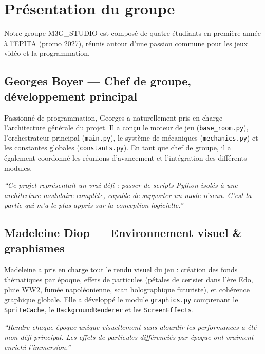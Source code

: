 \documentclass[12pt, a4paper]{report}
\begin{document}
\section{Pr\'{e}sentation du groupe}

Notre groupe M3G\_STUDIO est compos\'{e} de quatre \'{e}tudiants en premi\`{e}re ann\'{e}e \`{a} l'EPITA (promo 2027), r\'{e}unis autour d'une passion commune pour les jeux vid\'{e}o et la programmation.

\subsection{Georges Boyer --- Chef de groupe, d\'{e}veloppement principal}

Passionn\'{e} de programmation, Georges a naturellement pris en charge l'architecture g\'{e}n\'{e}rale du projet. Il a con\c{c}u le moteur de jeu (\texttt{base\_room.py}), l'orchestrateur principal (\texttt{main.py}), le syst\`{e}me de m\'{e}caniques (\texttt{mechanics.py}) et les constantes globales (\texttt{constants.py}). En tant que chef de groupe, il a \'{e}galement coordonn\'{e} les r\'{e}unions d'avancement et l'int\'{e}gration des diff\'{e}rents modules.

\textit{``Ce projet repr\'{e}sentait un vrai d\'{e}fi : passer de scripts Python isol\'{e}s \`{a} une architecture modulaire compl\`{e}te, capable de supporter un mode r\'{e}seau. C'est la partie qui m'a le plus appris sur la conception logicielle.''}

\subsection{Madeleine Diop --- Environnement visuel \& graphismes}

Madeleine a pris en charge tout le rendu visuel du jeu : cr\'{e}ation des fonds th\'{e}matiques par \'{e}poque, effets de particules (p\'{e}tales de cerisier dans l'\`{e}re Edo, pluie WW2, fum\'{e}e napol\'{e}onienne, scan holographique futuriste), et coh\'{e}rence graphique globale. Elle a d\'{e}velopp\'{e} le module \texttt{graphics.py} comprenant le \texttt{SpriteCache}, le \texttt{BackgroundRenderer} et les \texttt{ScreenEffects}.

\textit{``Rendre chaque \'{e}poque unique visuellement sans alourdir les performances a \'{e}t\'{e} mon d\'{e}fi principal. Les effets de particules diff\'{e}renci\'{e}s par \'{e}poque ont vraiment enrichi l'immersion.''}
\end{document}
